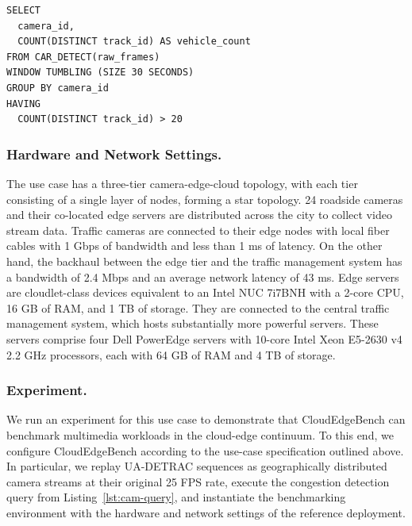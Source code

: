 \documentclass[runningheads]{llncs}
\begin{document}
\begin{lstlisting}[style=sqlstyle, frame=single, caption={Traffic Congestion Detection Query}]
SELECT
  camera_id,
  COUNT(DISTINCT track_id) AS vehicle_count
FROM CAR_DETECT(raw_frames)
WINDOW TUMBLING (SIZE 30 SECONDS)
GROUP BY camera_id
HAVING
  COUNT(DISTINCT track_id) > 20
\end{lstlisting}\label{lst:cam-query}

\subsubsection{Hardware and Network Settings.}
The use case has a three-tier camera-edge-cloud topology, with each tier consisting of a single layer of nodes, forming a star topology.
24 roadside cameras and their co-located edge servers are distributed across the city to collect video stream data.
Traffic cameras are connected to their edge nodes with local fiber cables with 1 Gbps of bandwidth and less than 1 ms of latency.
On the other hand, the backhaul between the edge tier and the traffic management system has a bandwidth of 2.4 Mbps and an average network latency of 43 ms.
%
Edge servers are cloudlet-class devices equivalent to an Intel NUC 7i7BNH with a 2-core CPU, 16 GB of RAM, and 1 TB of storage.
They are connected to the central traffic management system, which hosts substantially more powerful servers.
These servers comprise four Dell PowerEdge servers with 10-core Intel Xeon E5-2630 v4 2.2 GHz processors, each with 64 GB of RAM and 4 TB of storage.


\subsubsection{Experiment.}
We run an experiment for this use case to demonstrate that CloudEdgeBench can benchmark multimedia workloads in the cloud-edge continuum.
To this end, we configure CloudEdgeBench according to the use-case specification outlined above.
In particular, we replay UA-DETRAC sequences as geographically distributed camera streams at their original 25 FPS rate, execute the congestion detection query from Listing~\ref{lst:cam-query}, and instantiate the benchmarking environment with the hardware and network settings of the reference deployment.
\end{document}
